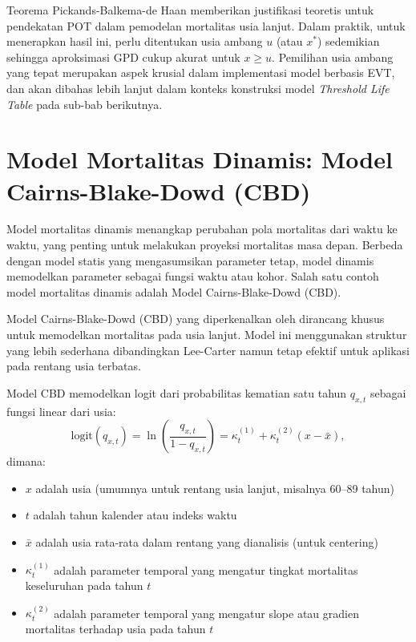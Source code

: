 Teorema Pickands-Balkema-de Haan memberikan justifikasi teoretis untuk pendekatan POT dalam pemodelan mortalitas usia lanjut. Dalam praktik, untuk menerapkan hasil ini, perlu ditentukan usia ambang $u$ (atau $x^*$) sedemikian sehingga aproksimasi GPD cukup akurat untuk $x \geq u$. Pemilihan usia ambang yang tepat merupakan aspek krusial dalam implementasi model berbasis EVT, dan akan dibahas lebih lanjut dalam konteks konstruksi model \textit{Threshold Life Table} pada sub-bab berikutnya.

\section{Model Mortalitas Dinamis: Model Cairns-Blake-Dowd (CBD)}

Model mortalitas dinamis menangkap perubahan pola mortalitas dari waktu ke waktu, yang penting untuk melakukan proyeksi mortalitas masa depan. Berbeda dengan model statis yang mengasumsikan parameter tetap, model dinamis memodelkan parameter sebagai fungsi waktu atau kohor. Salah satu contoh model mortalitas dinamis adalah Model Cairns-Blake-Dowd (CBD).

Model Cairns-Blake-Dowd (CBD) yang diperkenalkan oleh \citet{cairns2006two} dirancang khusus untuk memodelkan mortalitas pada usia lanjut. Model ini menggunakan struktur yang lebih sederhana dibandingkan Lee-Carter namun tetap efektif untuk aplikasi pada rentang usia terbatas.

Model CBD memodelkan logit dari probabilitas kematian satu tahun $q_{x,t}$ sebagai fungsi linear dari usia:
\begin{equation}
\text{logit}(q_{x,t}) = \ln\left(\frac{q_{x,t}}{1-q_{x,t}}\right) = \kappa_t^{(1)} + \kappa_t^{(2)} (x - \bar{x}),
\label{eq:cbd_basic}
\end{equation}
dimana:
\begin{itemize}
    \item $x$ adalah usia (umumnya untuk rentang usia lanjut, misalnya 60--89 tahun)
    \item $t$ adalah tahun kalender atau indeks waktu
    \item $\bar{x}$ adalah usia rata-rata dalam rentang yang dianalisis (untuk centering)
    \item $\kappa_t^{(1)}$ adalah parameter temporal yang mengatur tingkat mortalitas keseluruhan pada tahun $t$
    \item $\kappa_t^{(2)}$ adalah parameter temporal yang mengatur slope atau gradien mortalitas terhadap usia pada tahun $t$
\end{itemize}

